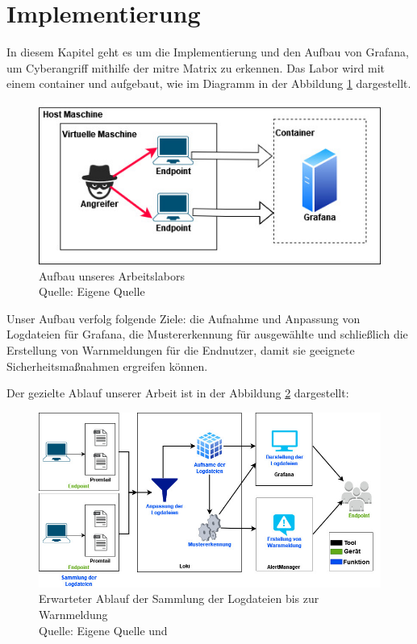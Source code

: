 \section{Implementierung}
In diesem Kapitel geht es um die Implementierung und den Aufbau von Grafana, um \gls{Cyberangriff} mithilfe der \gls{mitre} Matrix zu erkennen. Das Labor wird mit einem \gls{container} und  aufgebaut, wie im Diagramm in der Abbildung \ref{fig:Arbeitslabor} dargestellt.

\begin{figure}[H]
   \centering
   \includegraphics[width=1\textwidth]{assets/Arbeitslabor.jpg}
   \caption[Aufbau unseres Arbeitslabors]
   {Aufbau unseres Arbeitslabors \\Quelle: Eigene Quelle}
   \label{fig:Arbeitslabor}
   \centering
\end{figure}

Unser Aufbau verfolg folgende Ziele: die Aufnahme und Anpassung von Logdateien für Grafana, die Mustererkennung für ausgewählte  und schließlich die Erstellung von Warnmeldungen für die Endnutzer, damit sie geeignete Sicherheitsmaßnahmen ergreifen können.

\newpage
Der gezielte Ablauf unserer Arbeit ist in der Abbildung \ref{fig:Ablauf_grafana2} dargestellt:

\begin{figure}[H]
   \centering
   \includegraphics[width=1\textwidth]{assets/Ablauf_grafana2.jpg}
   \caption[Erwarteter Ablauf der Sammlung der Logdateien bis zur Warnmeldung]
   {Erwarteter Ablauf der Sammlung der Logdateien bis zur Warnmeldung \\ Quelle: Eigene Quelle und \citep{Grafana_loki}}
   \label{fig:Ablauf_grafana2}
   \centering
\end{figure}

